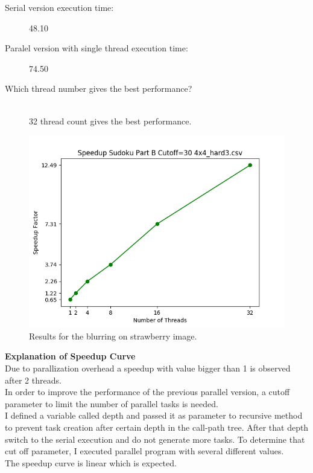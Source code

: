 \documentclass{article}
\newcommand\tab[1][0.5cm]{\hspace*{#1}}
\begin{document}
\begin{description}
\item[Serial version execution time: ] 48.10
\item[Paralel version with single thread execution time: ] 74.50
\item[Which thread number gives the best performance?]\hfill \\
32 thread count gives the best performance.

\end{description} 
\begin{figure}[!htb]
        \centering
        \includegraphics[width=1\linewidth]{./img/speedup_part_2_B.png}
        \caption{Results for the blurring on strawberry image.}
\end{figure}
\textbf{Explanation of Speedup Curve}\\
\tab Due to parallization overhead a speedup with value bigger than 1 is observed after 2 threads. \\
\tab In order to improve the performance of the previous parallel version, a cutoff parameter 
to limit the number of parallel tasks is needed.\\
\tab I defined a variable called depth and passed it as parameter to recursive method  
to prevent task creation after certain depth in the call-path tree. 
After that depth switch to the serial execution and do not generate more tasks.
To determine that cut off parameter, I executed parallel program with several
different values.\\
\tab The speedup curve is linear which is expected.  
\end{document}
